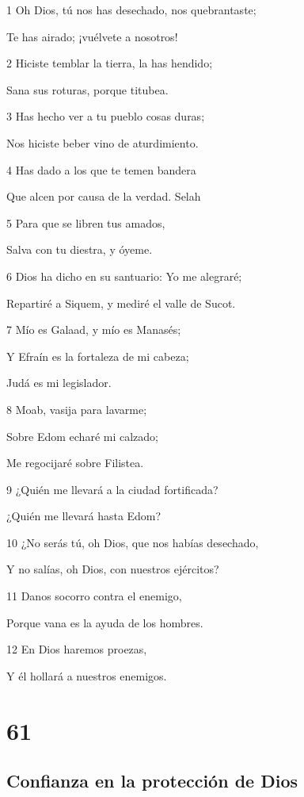 \par 1 Oh Dios, tú nos has desechado, nos quebrantaste;
\par Te has airado; ¡vuélvete a nosotros!
\par 2 Hiciste temblar la tierra, la has hendido;
\par Sana sus roturas, porque titubea.
\par 3 Has hecho ver a tu pueblo cosas duras;
\par Nos hiciste beber vino de aturdimiento.
\par 4 Has dado a los que te temen bandera
\par Que alcen por causa de la verdad. Selah
\par 5 Para que se libren tus amados,
\par Salva con tu diestra, y óyeme.
\par 6 Dios ha dicho en su santuario: Yo me alegraré;
\par Repartiré a Siquem, y mediré el valle de Sucot.
\par 7 Mío es Galaad, y mío es Manasés;
\par Y Efraín es la fortaleza de mi cabeza;
\par Judá es mi legislador.
\par 8 Moab, vasija para lavarme;
\par Sobre Edom echaré mi calzado;
\par Me regocijaré sobre Filistea.
\par 9 ¿Quién me llevará a la ciudad fortificada?
\par ¿Quién me llevará hasta Edom?
\par 10 ¿No serás tú, oh Dios, que nos habías desechado,
\par Y no salías, oh Dios, con nuestros ejércitos?
\par 11 Danos socorro contra el enemigo,
\par Porque vana es la ayuda de los hombres.
\par 12 En Dios haremos proezas,
\par Y él hollará a nuestros enemigos.

\chapter{61}

\section*{Confianza en la protección de Dios}

